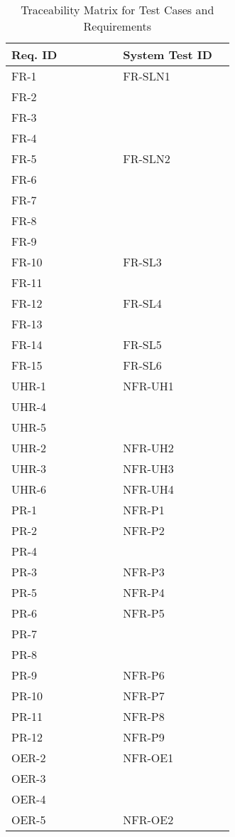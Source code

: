 \documentclass[12pt, titlepage]{article}
\begin{document}
\begin{longtable}{|p{0.45\linewidth}|p{0.45\linewidth}|}
  \caption{Traceability Matrix for Test Cases and Requirements} \label{table:traceability}\\
  \hline
  \textbf{Req. ID} & \textbf{System Test ID} \\
  \hline
  FR-1 & FR-SLN1\\
  FR-2 & \\
  FR-3 & \\
  FR-4 & \\
  \hline
  FR-5 & FR-SLN2\\
  FR-6 & \\
  FR-7 & \\
  FR-8 & \\
  FR-9 & \\
  \hline
  FR-10 & FR-SL3\\
  FR-11 & \\
  \hline
  FR-12 & FR-SL4\\
  FR-13 & \\
  \hline
  FR-14 & FR-SL5\\
  \hline
  FR-15 & FR-SL6\\
  \hline
  UHR-1 & NFR-UH1\\
  UHR-4 & \\
  UHR-5 & \\
  \hline
  UHR-2 & NFR-UH2\\
  \hline
  UHR-3 & NFR-UH3\\
  \hline
  UHR-6 & NFR-UH4\\
  \hline
  PR-1 & NFR-P1\\
  \hline
  PR-2 & NFR-P2\\
  PR-4 & \\
  \hline
  PR-3 & NFR-P3\\
  \hline
  PR-5 & NFR-P4\\
  \hline
  PR-6 & NFR-P5\\
  PR-7 & \\
  PR-8 & \\
  \hline
  PR-9 & NFR-P6\\
  \hline
  PR-10 & NFR-P7\\
  \hline
  PR-11 & NFR-P8\\
  \hline
  PR-12 & NFR-P9\\
  \hline
  OER-2 & NFR-OE1\\
  OER-3 & \\
  OER-4 & \\
  \hline
  OER-5 & NFR-OE2\\
  \hline

\end{longtable}
\end{document}
